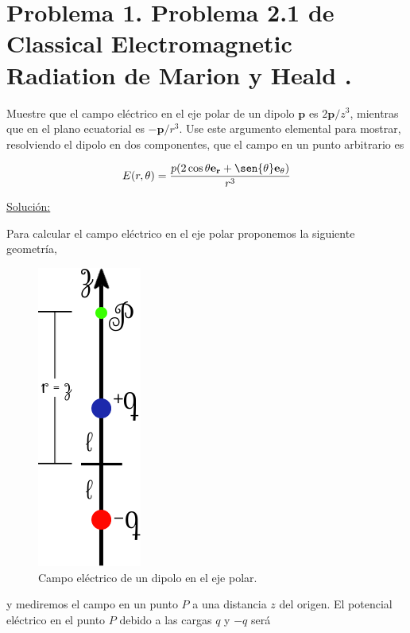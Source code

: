 \documentclass[a4paper,11pt]{article}
\numberwithin{equation}{section}
\renewcommand{\thefootnote}{\fnsymbol{footnote}}
\begin{document}
\setcounter{footnote}{0}
\renewcommand*{\thefootnote}{\arabic{footnote}}

\section{Problema 1. Problema 2.1 de Classical Electromagnetic Radiation
de Marion y Heald \cite{marion2}.}

Muestre que el campo eléctrico en el eje polar de un dipolo $\mathbf{p}$ es 
$2\mathbf{p}/z^3$, mientras que en el plano ecuatorial es $-\mathbf{p}/r^3$. Use 
este argumento elemental para mostrar, resolviendo el dipolo en dos componentes, que 
el campo en un punto arbitrario es 

$$
E(r,\theta) = \frac{p(2\cos{\theta}\mathbf{e_r} + \sen{\theta}\mathbf{e_\theta})}{r^3}
$$

\vspace{.3cm}

\underline{Solución:} \vspace{.3cm}

Para calcular el campo eléctrico en el eje polar proponemos la siguiente geometría,

\begin{figure}[H]
 \center 
 \includegraphics[scale=0.5]{problema1fig1}
 \caption{Campo eléctrico de un dipolo en el eje polar.}
 \label{fig:problema1fig1}
\end{figure}

y mediremos el campo en un punto $P$ a una distancia $z$ del origen. El potencial 
eléctrico en el punto $P$ debido a las cargas $q$ y $-q$ será 
\end{document}
